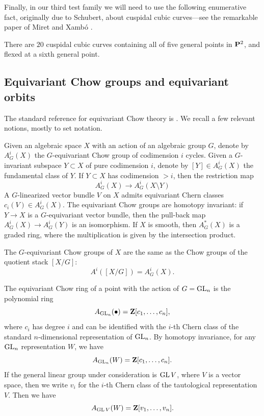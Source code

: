 \documentclass[12pt,reqno]{amsart}
\renewcommand{\to}{{\longrightarrow}}
\numberwithin{equation}{section}
\begin{document}
Finally, in our third test family we will need to use the following
enumerative fact, originally due to Schubert, about cuspidal cubic
curves---see the remarkable paper of Miret and Xamb\'o
\cite{m,mir.des:89}.

 \begin{theorem}
   \label{theorem:Schubert} There are $20$ cuspidal cubic curves
   containing all of five general points in $\P^{2}$, and flexed at a
   sixth general point.
 \end{theorem}
\subsection{Equivariant Chow groups and equivariant orbits}
The standard reference for equivariant Chow theory is \cite{edi.gra:98}.
We recall a few relevant notions, mostly to set notation.

Given an algebraic space $X$ with an action of an algebraic group $G$,
denote by $A^i_G(X)$ the $G$-equivariant Chow group of codimension $i$
cycles.  Given a $G$-invariant subspace $Y \subset X$ of pure
codimension $i$, denote by $[Y] \in A^i_G(X)$ the fundamental class of
$Y$.  If $Y \subset X$ has codimension $> i$, then the restriction map
\[ A^i_G(X) \to A^i_G(X \setminus Y)\] A $G$-linearized vector bundle
$V$ on $X$ admits equivariant Chern classes $c_i(V) \in A^i_G(X)$.
The equivariant Chow groups are homotopy invariant: if $Y \to X$ is a
$G$-equivariant vector bundle, then the pull-back map
$A^i_G(X) \to A^i_G(Y)$ is an isomorphism.  If $X$ is smooth, then
$A^*_G(X)$ is a graded ring, where the multiplication is given by the
intersection product.

The $G$-equivariant Chow groups of $X$ are the same as the Chow groups
of the quotient stack $[X/G]$:
\[ A^i\left( [X/G] \right) = A^i_G(X).\]

The equivariant Chow ring of a point with the action of $G = \GL_n$ is
the polynomial ring
\[ A_{\GL_n}(\bullet) = \Z[c_1,\dots, c_n],\] where $c_i$ has
degree $i$ and can be identified with the $i$-th Chern class of the
standard $n$-dimensional representation of $\GL_n$.  By homotopy
invariance, for any $\GL_n$ representation $W$, we have
\[ A_{\GL_n}(W) = \Z[c_1,\dots,c_n].\] If the general linear
group under consideration is $\GL V$, where $V$ is a vector space,
then we write $v_i$ for the $i$-th Chern class of the tautological
representation $V$.  Then we have
\[ A_{\GL V}(W) = \Z[v_1,\dots,v_n].\]
\end{document}
